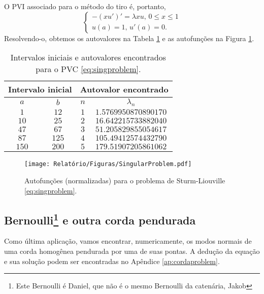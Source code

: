 \documentclass[twocolumn,showpacs,%
  nofootinbib,aps,superscriptaddress,%
  eqsecnum,prd,notitlepage,showkeys,10pt]{revtex4-1}
\renewcommand{\leq}{\leqslant}
\begin{document}
%
O PVI associado para o método do tiro é, portanto,
%
\[
    \left\{
        \begin{array}{l}
            -(xu')' = \lambda xu, \, 0 \leq x\leq 1 \\ 
            u(a) = 1, \, u'(a) = 0.
        \end{array}
    \right.
\]
%
Resolvendo-o, obtemos os autovalores na Tabela \ref{tab:singproblem} e
as autofunções na Figura \ref{fig:singproblem}.
%
\begin{table}[H]
    \centering
    \caption{Intervalos iniciais e autovalores encontrados para o PVC \eqref{eq:singproblem}.}
    \begin{tabular}{cc|cc}
        \multicolumn{2}{c}{Intervalo inicial} & \multicolumn{2}{c}{Autovalor encontrado} \\
        \hline
        $a$ & $b$ & $n$ & $\lambda_n$ \\
        \hline
        $1$ & $12$ & $1$ & $1.5769950870890170$ \\
        $10$ & $25$ & $2$ & $16.642215733882040$ \\
        $47$ & $67$ & $3$ & $51.205829855054617$ \\
        $87$ & $125$ & $4$ & $105.49412574432790$ \\
        $150$ & $200$ & $5$ & $179.51907205861062$ \\
        \hline
    \end{tabular}
    \label{tab:singproblem}
\end{table}
%
%
\begin{figure}[H]
    \centering
    \texttt{[image: Relatório/Figuras/SingularProblem.pdf]}
    \caption{Autofunções (normalizadas) para o problema de Sturm-Liouville
    \eqref{eq:singproblem}.}
    \label{fig:singproblem}
\end{figure}
%
\subsection{Bernoulli\footnote{Este Bernoulli é Daniel, que não é o mesmo Bernoulli
da catenária, Jakob} e outra corda pendurada}
%
Como última aplicação, vamos encontrar, numericamente, os modos normais
de uma corda homogênea pendurada por uma de suas pontas. A dedução da equação
e sua solução podem ser encontradas no Apêndice \ref{ap:cordaproblem}.
\end{document}
